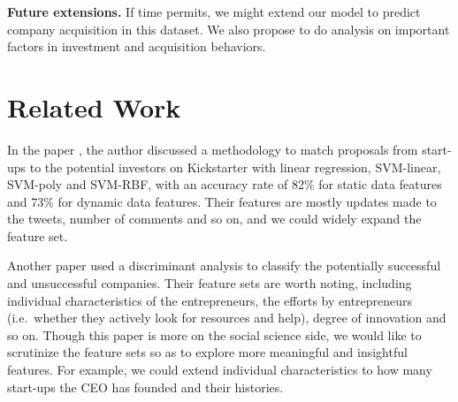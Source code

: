 \textbf{Future extensions.} If time permits, we might extend our model
to predict company acquisition in this dataset. We also propose to do
analysis on important factors in investment and acquisition behaviors.

\section{Related Work}\label{related-work}

In the paper \cite{an2014recommending}, the author discussed a
methodology to match proposals from start-ups to the potential investors
on Kickstarter with linear regression, SVM-linear, SVM-poly and SVM-RBF,
with an accuracy rate of 82\% for static data features and 73\% for
dynamic data features. Their features are mostly updates made to the
tweets, number of comments and so on, and we could widely expand the
feature set.

Another paper \cite{gartner1999predicting} used a discriminant analysis
to classify the potentially successful and unsuccessful companies. Their
feature sets are worth noting, including individual characteristics of
the entrepreneurs, the efforts by entrepreneurs (i.e.~whether they
actively look for resources and help), degree of innovation and so on.
Though this paper is more on the social science side, we would like to
scrutinize the feature sets so as to explore more meaningful and
insightful features. For example, we could extend individual
characteristics to how many start-ups the CEO has founded and their
histories.
